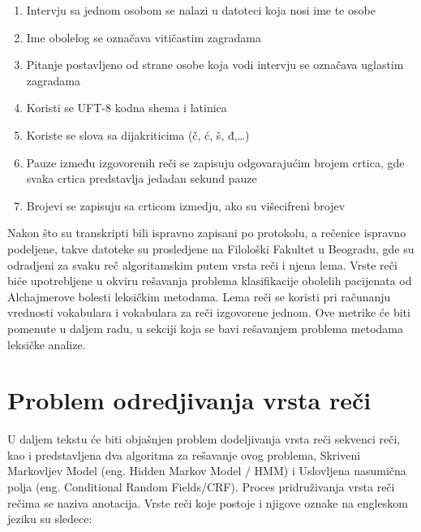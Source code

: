 \documentclass[12pt,oneside]{memoir}
\begin{document}
\begin{enumerate}
\item Intervju sa jednom osobom se nalazi u datoteci koja nosi ime te osobe
\item Ime obolelog se označava vitičastim zagradama 
\item Pitanje postavljeno od strane osobe koja vodi intervju se označava uglastim zagradama
\item Koristi se UFT-8 kodna shema i latinica
\item Koriste se slova sa dijakriticima (č, ć, š, đ,…)
\item Pauze između izgovorenih reči se zapisuju odgovarajućim brojem crtica,  gde svaka crtica predstavlja jedadan sekund pauze
\item Brojevi se zapisuju sa crticom izmedju,  ako su višecifreni brojev
\end{enumerate}

Nakon što su transkripti bili ispravno zapisani po protokolu,  a rečenice ispravno podeljene,  takve datoteke su prosledjene na Filološki Fakultet u Beogradu,  gde su odradjeni za svaku reč algoritamskim putem vrsta reči i njena lema.  Vrste reči biće upotrebljene u okviru rešavanja problema klasifikacije obolelih pacijenata od Alchajmerove bolesti leksičkim metodama.  Lema reči se koristi pri računanju vrednosti vokabulara i vokabulara za reči izgovorene jednom.  Ove metrike će biti pomenute u daljem radu, u sekciji koja se bavi rešavanjem problema metodama leksičke analize. 

\section{Problem odredjivanja vrsta reči}

U daljem tekstu će biti objašnjen problem dodeljivanja vrsta reči sekvenci reči,  kao i predstavljena dva algoritma za rešavanje ovog problema,  Skriveni Markovljev Model (eng. Hidden Markov Model / HMM) i Uslovljena nasumična polja (eng. Conditional Random Fields/CRF).  Proces pridruživanja vrsta reči rečima se naziva anotacija. Vrste reči koje postoje i njigove oznake na engleskom jeziku su sledece:
\end{document}
